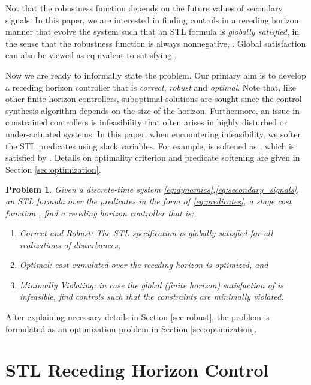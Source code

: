 \documentclass[letterpaper, 10 pt, conference]{ieeeconf}
\newtheorem{problem}{Problem}
\begin{document}
Not that the robustness function depends on the future values of secondary signals. In this paper, we are interested in finding controls in a receding horizon manner that evolve the system such that an STL formula  is \emph{globally satisfied}, in the sense that the robustness function is always nonnegative, . Global satisfaction can also be viewed as equivalent to satisfying . 

Now we are ready to informally state the problem. Our primary aim is to develop a receding horizon controller that is \emph{correct}, \emph{robust} and \emph{optimal}. 
Note that, like other finite horizon controllers, suboptimal solutions are sought since the control synthesis algorithm depends on the size of the horizon. Furthermore, an issue in constrained controllers is infeasibility that often arises in highly disturbed or under-actuated systems. In this paper, when encountering infeasibility, we soften the STL predicates using slack variables. For example,  is softened as , which is satisfied by .  Details on optimality criterion and predicate softening are given in Section \ref{sec:optimization}. 
\begin{problem}
\label{problem:problem}
Given a discrete-time system \eqref{eq:dynamics},\eqref{eq:secondary_signals}, an STL formula  over the predicates in the form of \eqref{eq:predicates}, a stage cost function , find a receding horizon controller that is:
\begin{enumerate}
\item Correct and Robust: The STL specification  is globally satisfied for all realizations of disturbances,
\item Optimal: cost  cumulated over the receding horizon is optimized, and
\item Minimally Violating: in case the global (finite horizon) satisfaction of  is infeasible, find controls such that the constraints are minimally violated.
\end{enumerate}
\end{problem}
After explaining necessary details in Section \ref{sec:robust}, the problem is formulated as an optimization problem in Section \ref{sec:optimization}. 






\section{STL Receding Horizon Control}
\label{sec:rhc}
\end{document}
